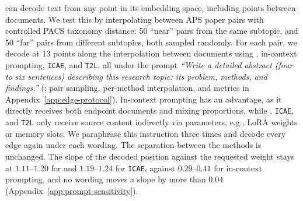 \begin{table}[t]
    \centering
    \footnotesize
    \setlength{\tabcolsep}{4pt}
    \caption{One near pair decoded along the edge at $25$, $50$ and $75\,\%$ weight on paper B, under the prompt quoted in the text.
    Paper A is ``Statistical mechanics of learning from examples'' (PhysRevA 45.6056) and paper B is ``Good quantum error-correcting codes exist'' (PhysRevA 54.1098).
    Each cell is the opening of the decoded abstract, whole sentences cut at $22$ words.
    Where the decoded abstracts actually land between the two papers, averaged over all $50$ near pairs at each of the $13$ grid points, is e.
    }
    \label{tab:mixing-decode}
    
\end{table}

\doctolora can decode text from any point in its embedding space, including points between documents. 
We test this by interpolating between APS paper pairs with controlled PACS taxonomy distance: 50 ``near'' pairs from the same subtopic, and 50 ``far'' pairs from different subtopics, both sampled randomly.
For each pair, we decode at 13 points along the interpolation between documents using \doctolora, in-context prompting, \texttt{ICAE}, and \texttt{T2L}, all under the prompt \textit{``Write a detailed abstract (four to six sentences) describing this research topic: its problem, methods, and findings.''} (; pair sampling, per-method interpolation, and metrics in Appendix~\ref{app:edge-protocol}).
In-context prompting has an advantage, as it directly receives both endpoint documents and mixing proportions, while \doctolora, \texttt{ICAE}, and \texttt{T2L} only receive source content indirectly via parameters, e.g., LoRA weights or memory slots. 
We paraphrase this instruction three times and decode every edge again under each wording.
The separation between the methods is unchanged.
The slope of the decoded position against the requested weight stays at $1.11$--$1.20$ for \doctolora and $1.19$--$1.24$ for \texttt{ICAE}, against $0.29$--$0.41$ for in-context prompting, and no wording moves a slope by more than $0.04$ (Appendix~\ref{app:prompt-sensitivity}).

